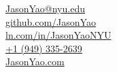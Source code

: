 \documentclass[]{hieudo-build}
\begin{document}
{
\small %
	\faEnvelope \hspace{0.1cm} \href{mailto:JasonYao@nyu.edu}{JasonYao@nyu.edu}\\
	\faGithub \hspace{0.1cm} \href{https://github.com/JasonYao}{github.com/JasonYao}\\
	\faLinkedinSquare \hspace{0.1cm} \href{https://www.linkedin.com/in/JasonYaoNYU/}{ln.com/in/JasonYaoNYU}\\
    \faPhone \hspace{0.1cm} \href{tel:19493352639}{+1 (949) 335-2639} \\
    \faGlobe \hspace{0.1cm} \href{https://www.JasonYao.com}{JasonYao.com}
}
\end{document}
